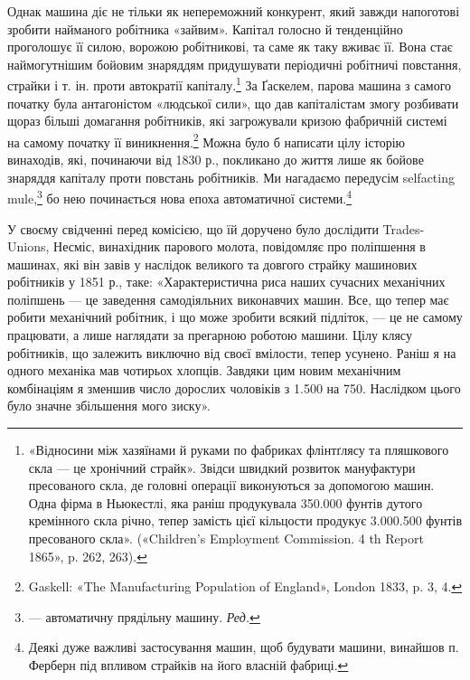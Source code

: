 Однак машина діє не тільки як непереможний конкурент,
який завжди напоготові зробити найманого робітника «зайвим».
Капітал голосно й тенденційно проголошує її силою, ворожою
робітникові, та саме як таку вживає її. Вона стає наймогутнішим
бойовим знаряддям придушувати періодичні робітничі повстання,
страйки і т. ін. проти автократії капіталу.\footnote{
«Відносини між хазяїнами й руками по фабриках флінтґлясу та пляшкового
скла — це хронічний страйк». Звідси швидкий розвиток мануфактури
пресованого скла, де головні операції виконуються за допомогою машин.
Одна фірма в Ньюкестлі, яка раніш продукувала 350.000 фунтів дутого
кремінного скла річно, тепер замість цієї кільцости продукує 3.000.500
фунтів пресованого скла». («Children’s Employment Commission. 4 th
Report 1865», p. 262, 263).
} За Ґаскелем,
парова машина з самого початку була антагоністом «людської
сили», що дав капіталістам змогу розбивати щораз більші
домагання робітників, які загрожували кризою фабричній системі
на самому початку її виникнення.\footnote{
Gaskell: «The Manufacturing Population of England», London
1833, p. 3, 4.
} Можна було б написати
цілу історію винаходів, які, починаючи від 1830 р., покликано
до життя лише як бойове знаряддя капіталу проти повстань робітників.
Ми нагадаємо передусім selfacting mule,\footnote*{
— автоматичну прядільну машину. \emph{Ред.}
} бо нею починається
нова епоха автоматичної системи.\footnote{
Деякі дуже важливі застосування машин, щоб будувати машини,
винайшов п. Ферберн під впливом страйків на його власній фабриці.
}

У своєму свідченні перед комісією, що їй доручено було дослідити
Trades-Unions, Несміс, винахідник парового молота, повідомляє
про поліпшення в машинах, які він завів у наслідок
великого та довгого страйку машинових робітників у 1851 р.,
таке: «Характеристична риса наших сучасних механічних поліпшень
— це заведення самодіяльних виконавчих машин. Все, що
тепер має робити механічний робітник, і що може зробити всякий
підліток, — це не самому працювати, а лише наглядати за прегарною
роботою машини. Цілу клясу робітників, що залежить
виключно від своєї вмілости, тепер усунено. Раніш я на одного
механіка мав чотирьох хлопців. Завдяки цим новим механічним
комбінаціям я зменшив число дорослих чоловіків з 1.500 на 750.
Наслідком цього було значне збільшення мого зиску».

